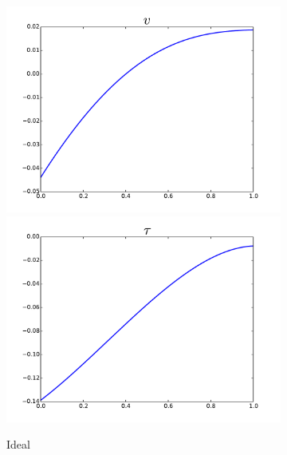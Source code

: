 \documentclass{article}
\begin{document}
\begin{figure}[ht]
\centering
\begin{subfigure}[t]{0.4\textwidth}
\centering
\includegraphics[width=\textwidth]{OptimalTestFunctions/Robust_v}\\
\includegraphics[width=\textwidth]{OptimalTestFunctions/Robust_tau}\\
\caption{Ideal}
\label{fig:idealRobust}
\end{subfigure}
\begin{subfigure}[t]{0.4\textwidth}
\centering

\end{subfigure}
\end{figure}
\end{document}
